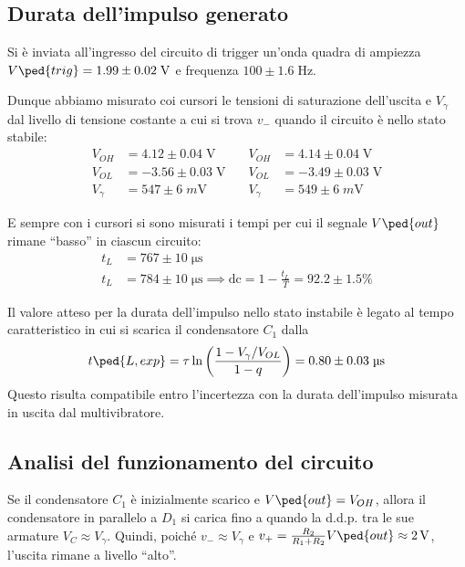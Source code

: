\documentclass[10pt, a4paper, italian]{article}
\begin{document}
\subsection{Durata dell'impulso generato}
Si è inviata all'ingresso del circuito di trigger un'onda quadra di ampiezza
$V\ped{trig} = 1.99 \pm 0.02 \; \si{\V}$ e frequenza $100 \pm 1.6 \; \si{\Hz}$.

Dunque abbiamo misurato coi cursori le tensioni di saturazione dell'uscita e 
$V_\gamma$ dal livello di tensione costante a cui si trova $v_-$ quando il
circuito è nello stato stabile:
\begin{align*}
V_{OH} &= 4.12 \pm 0.04 \; \si{\V} \quad &V_{OH} &= 4.14 \pm 0.04 \; \si{\V} \\
V_{OL} &= -3.56 \pm 0.03 \; \si{\V} \quad &V_{OL} &= -3.49 \pm 0.03 \; \si{\V} \\
V_{\gamma} &= 547 \pm 6 \; \si{m\V} \quad &V_{\gamma} &= 549 \pm 6 \; \si{m\V}
\end{align*}

E sempre con i cursori si sono misurati i tempi per cui il segnale $V\ped{out}$
rimane ``basso'' in ciascun circuito:
\begin{align*}
t_L &= 767 \pm 10 \;\si{\micro\s} \\
t_L &= 784 \pm 10 \;\si{\micro\s}
\implies \mathrm{dc} = 1 - \frac{t_L}{T} = 92.2 \pm 1.5 \% 
\end{align*}

Il valore atteso per la durata dell'impulso nello stato instabile è legato
al tempo caratteristico in cui si scarica il condensatore $C_1$ dalla
\begin{equation}\label{eq: mstable_Delta}
t\ped{L, exp} = \tau \ln{\left(\frac{1 - V_\gamma/V_{OL}}{1 - q}\right)} =
0.80 \pm 0.03 \; \si{\micro\s}
\end{equation}
Questo risulta compatibile entro l'incertezza con la durata dell'impulso
misurata in uscita dal multivibratore.

\subsection{Analisi del funzionamento del circuito}
Se il condensatore $C_1$ è inizialmente scarico e $V\ped{out} = V_{OH}$, allora
il condensatore in parallelo a $D_1$ si carica fino a quando la d.d.p. tra le
sue armature $V_C \approx V_{\gamma}$. Quindi, poiché $v_- \approx V_{\gamma}$
e $v_+ = \frac{R_{2}}{R_{1} + R_{2}} V\ped{out} \approx \SI{2}{V}$, l'uscita
rimane a livello ``alto''.
\end{document}
